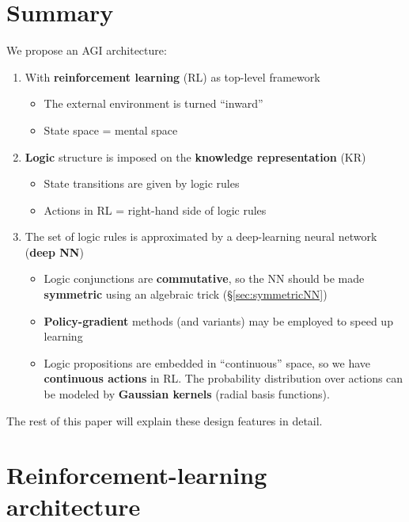 \documentclass[orivec]{llncs}
\begin{document}

\setcounter{section}{-1}
\section{Summary}
\label{sec:0}

We propose an AGI architecture:
\begin{enumerate}
	\item With \textbf{reinforcement learning} (RL) as top-level framework
	\begin{itemize}
		\item The external environment is turned ``inward''
		\item State space = mental space
	\end{itemize}
	\item \textbf{Logic} structure is imposed on the \textbf{knowledge representation} (KR)
		\begin{itemize}
		\item State transitions are given by logic rules
		\item Actions in RL = right-hand side of logic rules
	\end{itemize}
	\item The set of logic rules is approximated by a deep-learning neural network (\textbf{deep NN})
		\begin{itemize}
		\item Logic conjunctions are \textbf{commutative}, so the NN should be made \textbf{symmetric} using an algebraic trick (\S\ref{sec:symmetricNN})
		\item \textbf{Policy-gradient} methods (and variants) may be employed to speed up learning
		\item Logic propositions are embedded in ``continuous'' space, so we have \textbf{continuous actions} in RL.  The probability distribution over actions can be modeled by \textbf{Gaussian kernels} (radial basis functions).
	\end{itemize}
\end{enumerate}

The rest of this paper will explain these design features in detail.

\section{Reinforcement-learning architecture}
\end{document}
